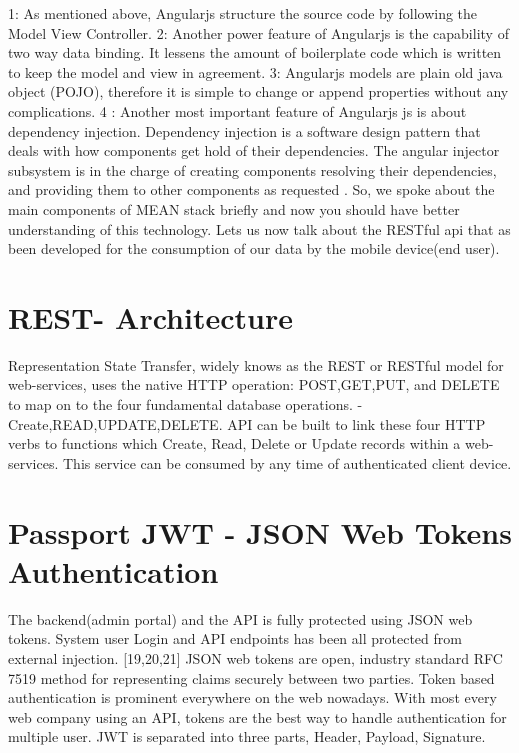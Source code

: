 		1: As mentioned above, Angularjs structure the source code by following the Model View Controller. 
		2: Another power feature of Angularjs is the capability of two way data binding. It lessens the amount of boilerplate code which is written to keep the model and view in agreement.
		3:  Angularjs models are plain old java object (POJO), therefore it is simple to change or append properties without any complications.
		4 : Another most important feature of Angularjs js is about dependency injection. Dependency injection is a software design pattern that deals with how components get hold of their dependencies. The angular injector subsystem is in the charge of creating components  resolving their dependencies, and providing them to other components as requested \cite{AngularJSDi}. 
		So, we spoke about the main components of MEAN stack briefly and  now you should have better understanding  of this technology.  Lets us now talk about the RESTful api that as been developed for the consumption of our data by the mobile device(end user).
		
		\section{REST- Architecture}
		\cite{expressRefWiki}\cite{restProgramming} Representation State Transfer, widely knows as the REST or RESTful model for web-services, uses the native HTTP operation: POST,GET,PUT, and DELETE to map on to the four fundamental database operations. - Create,READ,UPDATE,DELETE. API can be built to link these four HTTP verbs to functions which Create, Read, Delete or Update records within a web-services. This service can be consumed by any time of authenticated client device. 
		
		\section{Passport JWT - JSON Web Tokens Authentication}
		The backend(admin portal) and the API is fully protected using JSON web tokens. System user Login and API endpoints has been all protected from external injection.  \cite{AnatomyOfJWT} \cite{IETFRFC} \cite{DraftIETAOAUTH} [19,20,21] JSON web tokens are open, industry standard RFC 7519 method for representing claims securely between two parties.  Token based authentication is prominent everywhere on the web nowadays. With most every web company using an API, tokens are the best way to handle authentication for multiple user. JWT is separated into three parts, Header, Payload,  Signature.
		
